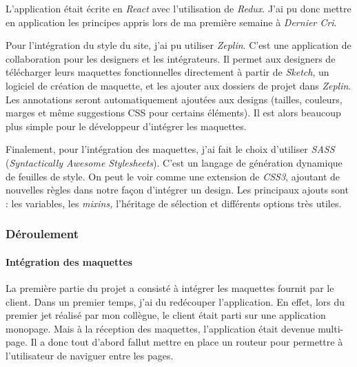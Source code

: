 \documentclass[12pt,a4paper]{article}
\begin{document}
  \bigskip

  L'application était écrite en \emph{React} avec l'utilisation de
  \emph{Redux}. J'ai pu donc mettre en application les principes appris
  lors de ma première semaine à \emph{Dernier Cri}.

  \bigskip

  Pour l'intégration du style du site, j'ai pu utiliser \emph{Zeplin}.
  C'est une application de collaboration pour les designers et les
  intégrateurs. Il permet aux designers de télécharger leurs maquettes
  fonctionnelles directement à partir de \emph{Sketch}, un logiciel de
  création de maquette, et les ajouter aux dossiers de projet dans
  \emph{Zeplin}. Les annotations seront automatiquement ajoutées aux
  designs (tailles, couleurs, marges et même suggestions CSS pour certains
  éléments). Il est alors beaucoup plus simple pour le développeur
  d'intégrer les maquettes.

  \bigskip

  Finalement, pour l'intégration des maquettes, j'ai fait le choix
  d'utiliser \emph{SASS} (\emph{Syntactically Awesome Stylesheets}). C'est
  un langage de génération dynamique de feuilles de style. On peut le voir
  comme une extension de \emph{CSS3}, ajoutant de nouvelles règles dans
  notre façon d'intégrer un design. Les principaux ajouts sont : les
  variables, les \emph{mixins,} l'héritage de sélection et différents
  options très utiles.

  \bigskip

  \subsubsection{Déroulement}\label{duxe9roulement}

  \bigskip

  \paragraph{Intégration des
  maquettes}\label{intuxe9gration-des-maquettes}

  \bigskip

  La première partie du projet a consisté à intégrer les maquettes fournit
  par le client. Dans un premier temps, j'ai du redécouper l'application.
  En effet, lors du premier jet réalisé par mon collègue, le client était
  parti sur une application monopage. Mais à la réception des maquettes,
  l'application était devenue multi-page. Il a donc tout d'abord fallut
  mettre en place un routeur pour permettre à l'utilisateur de naviguer
  entre les pages.
\end{document}
